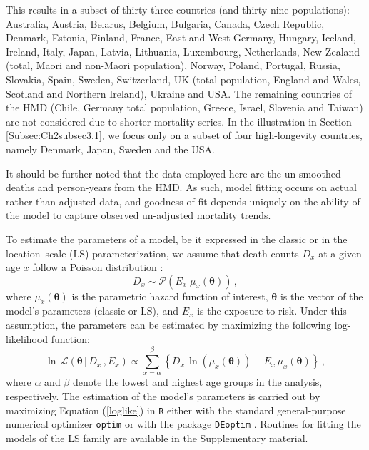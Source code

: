 \documentclass[Thesis]{subfiles}
\begin{document}
This results in a subset of thirty-three countries (and thirty-nine populations): Australia, Austria, Belarus, Belgium, Bulgaria, Canada, Czech Republic, Denmark, Estonia, Finland, France, East and West Germany, Hungary, Iceland, Ireland, Italy, Japan, Latvia, Lithuania, Luxembourg, Netherlands, New Zealand (total, Maori and non-Maori population), Norway, Poland, Portugal, Russia, Slovakia, Spain, Sweden,  Switzerland, UK (total population, England and Wales, Scotland and Northern Ireland), Ukraine and USA. The remaining countries of the HMD (Chile, Germany total population, Greece, Israel, Slovenia and Taiwan) are not considered due to shorter mortality series. In the illustration in Section \ref{Subsec:Ch2subsec3.1}, we focus only on a subset of four high-longevity countries, namely Denmark, Japan, Sweden and the USA. 

It should be further noted that the data employed here are the un-smoothed deaths and person-years from the HMD. As such, model fitting occurs on actual rather than adjusted data, and goodness-of-fit depends uniquely on the ability of the model to capture observed un-adjusted mortality trends.  

To estimate the parameters of a model, be it expressed in the classic or in the location--scale (LS) parameterization, we assume that death counts $D_{x}$ at a given age $x$ follow a Poisson distribution \citep{brillinger1986biometrics}: 
\begin{equation}\label{Eq:Poisson}
D_{x} \sim \mathcal{P}(E_{x} \; \mu_{x}(\boldsymbol{\theta})) \, ,
\end{equation}
where $\mu_{x}(\boldsymbol{\theta})$ is the parametric hazard function of interest, $\boldsymbol{\theta}$ is the vector of the model's parameters (classic or LS), and $E_x$ is the exposure-to-risk. Under this assumption, the parameters can be estimated by maximizing the following log-likelihood function: 
\begin{equation}\label{loglike}
\ln \, \mathcal{L}\left( \boldsymbol{\theta} \, | \, D_x \, , E_x \right) \propto \sum_{x=\alpha}^{\beta} \left \{  D_x \, \ln \left ( \mu_x(\boldsymbol{\theta}) \right ) - E_x \, \mu_x (\boldsymbol{\theta}) \right \} \, ,
\end{equation}
where $\alpha$ and $\beta$ denote the lowest and highest age groups in the analysis, respectively. The estimation of the model's parameters is carried out by maximizing Equation (\ref{loglike}) in \texttt{R} \citep{Rcite} either with the standard general-purpose numerical optimizer \texttt{optim} or with the package \texttt{DEoptim} \citep{mullen2011deoptim}. Routines for fitting the models of the LS family are available in the Supplementary material.
\end{document}
